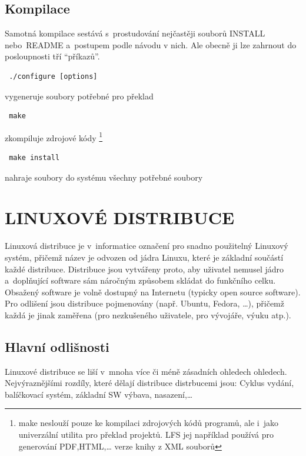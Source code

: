 \documentclass[a4paper,12pt]{article}
\newcommand{\sectionV}[1]{\section{\uppercase{#1}}}	%
\begin{document}
\subsection{Kompilace}
Samotná kompilace sestává s~prostudování nejčastěji souborů INSTALL nebo README a~postupem podle návodu v nich. Ale obecně ji lze zahrnout do posloupnosti tří ``příkazů''.
\begin{verbatim}
 ./configure [options]
\end{verbatim}
vygeneruje soubory potřebné pro překlad
\begin{verbatim}
 make
\end{verbatim}
zkompiluje zdrojové kódy \footnote{make neslouží pouze ke kompilaci zdrojových kódů programů, ale i~jako univerzální utilita pro překlad projektů. LFS jej například používá pro generování PDF,HTML,… verze knihy z XML souborů}
\begin{verbatim}
 make install
\end{verbatim} 
nahraje soubory do systému všechny potřebné soubory

\sectionV{Linuxové distribuce}
Linuxová distribuce je v~informatice označení pro snadno použitelný Linuxový systém, přičemž název je odvozen od jádra Linuxu, které je základní součástí každé distribuce. Distribuce jsou vytvářeny proto, aby uživatel nemusel jádro a~doplňující software sám náročným způsobem skládat do funkčního celku. Obsažený software je volně dostupný na Internetu (typicky open source software). Pro odlišení jsou distribuce pojmenovány (např. Ubuntu, Fedora, …), přičemž každá je jinak zaměřena (pro nezkušeného uživatele, pro vývojáře, výuku atp.).\cite{WDIST}

\subsection{Hlavní odlišnosti}
Linuxové distribuce se liší v~mnoha více či méně zásadních ohledech ohledech. Nejvýraznějšími rozdíly, které dělají distribuce distrbucemi jsou: Cyklus vydání, balíčkovací systém, základní SW výbava, nasazení,…
\end{document}
